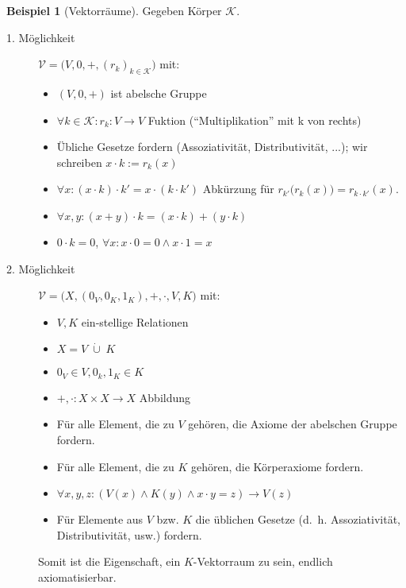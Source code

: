 \documentclass{article}
\theoremstyle{definition}
\newtheorem*{bsp}{Beispiel}
\theoremstyle{plain}
\newcommand{\m}[1]{\mathcal{#1}}
\begin{document}
    \begin{bsp}[Vektorräume]
        Gegeben Körper $ \m{K} $.
        \begin{description}
            \item[1. Möglichkeit]
            $ \m{V} = \big(V, 0, +, (r_k)_{k \in \m{K}} \big) $ mit:
            \begin{itemize}
                \item $ (V, 0, +) $ ist abelsche Gruppe
                \item $ \forall k \in \m{K}: r_k : V \rightarrow V $ Fuktion (``Multiplikation'' mit k von rechts)
                \item Übliche Gesetze fordern (Assoziativität, Distributivität, ...); wir schreiben $ x \cdot k := r_k(x) $
                \item $ \forall x: (x \cdot k) \cdot k' = x \cdot (k \cdot k') $ Abkürzung für $ r_{k'}\big(r_k(x)\big) = r_{k \cdot k'}(x) $.
                \item $ \forall x, y: (x + y ) \cdot k = (x \cdot k) + (y \cdot k) $
                \item $ 0 \cdot k = 0 $, $ \forall x: x \cdot 0 = 0 \land x \cdot 1 = x $
            \end{itemize}

            \item[2. Möglichkeit]
            $ \m{V} = \big(X, (0_V, 0_K, 1_K), +, \cdot, V, K\big) $ mit:
            \begin{itemize}
                \item $ V , K $ ein-stellige Relationen
                \item $ X = V \; \dot\cup \; K $
                \item $ 0_V \in V, 0_k, 1_K \in K $
                \item $ +, \cdot : X \times X \rightarrow X $ Abbildung
                \item Für alle Element, die zu $ V $ gehören, die Axiome der abelschen Gruppe fordern.
                \item Für alle Element, die zu $ K $ gehören, die Körperaxiome fordern.
                \item $ \forall x, y, z: (V(x) \land K(y) \land x \cdot y = z) \rightarrow V(z) $
                \item Für Elemente aus $ V $ bzw. $ K $ die üblichen Gesetze (d.~h. Assoziativität, Distributivität, usw.) fordern.
            \end{itemize}
            Somit ist die Eigenschaft, ein $ K $-Vektorraum zu sein, endlich axiomatisierbar.


\end{description}
\end{bsp}
\end{document}
